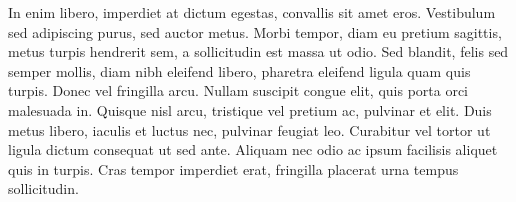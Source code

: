 In enim libero, imperdiet at dictum egestas, convallis sit amet eros. Vestibulum sed adipiscing purus, sed auctor metus. Morbi tempor, diam eu pretium sagittis, metus turpis hendrerit sem, a sollicitudin est massa ut odio. Sed blandit, felis sed semper mollis, diam nibh eleifend libero, pharetra eleifend ligula quam quis turpis. Donec vel fringilla arcu. Nullam suscipit congue elit, quis porta orci malesuada in. Quisque nisl arcu, tristique vel pretium ac, pulvinar et elit. Duis metus libero, iaculis et luctus nec, pulvinar feugiat leo. Curabitur vel tortor ut ligula dictum consequat ut sed ante. Aliquam nec odio ac ipsum facilisis aliquet quis in turpis. Cras tempor imperdiet erat, fringilla placerat urna tempus sollicitudin.

